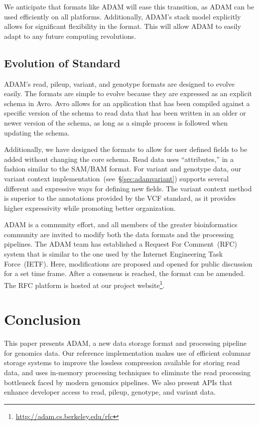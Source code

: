 \documentclass{bioinfo}
\begin{document}
We anticipate that formats like ADAM will ease this transition, as ADAM can be used efficiently on all platforms. Additionally, ADAM's stack model explicitly allows for significant
flexibility in the format. This will allow ADAM to easily adapt to any future computing revolutions.

\subsection{Evolution of Standard}
\label{sec:evolution-of-standard}

ADAM's read, pileup, variant, and genotype formats are designed to evolve easily. The formats are simple to evolve because they are expressed as an explicit schema
in Avro. Avro allows for an application that has been compiled against a specific version of the schema to read data that has been written in an older or newer version of the
schema, as long as a simple process is followed when updating the schema.

Additionally, we have designed the formats to allow for user defined fields to be added without changing the core schema. Read data uses ``attributes,'' in a fashion similar to
the SAM/BAM format. For variant and genotype data, our variant context implementation~(see~\S\ref{sec:adamvariant}) supports several different and expressive ways for
defining new fields. The variant context method is superior to the annotations provided by the VCF standard, as it provides higher expressivity while promoting better
organization.

ADAM is a community effort, and all members of the greater bioinformatics community are invited to modify both the data formats and the processing pipelines. The ADAM team
has established a Request For Comment~(RFC) system that is similar to the one used by the Internet Engineering Task Force~(IETF). Here, modifications are proposed and
opened for public discussion for a set time frame. After a consensus is reached, the format can be amended. The RFC platform is hosted at our project
website\footnote{\url{http://adam.cs.berkeley.edu/rfc}}.

\section{Conclusion}
\label{sec:conclusion}

This paper presents ADAM, a new data storage format and processing pipeline for genomics data. Our reference implementation makes use of efficient columnar storage
systems to improve the lossless compression available for storing read data, and uses in-memory processing techniques to eliminate the read processing bottleneck faced by
modern genomics pipelines. We also present APIs that enhance developer access to read, pileup, genotype, and variant data.
\end{document}
